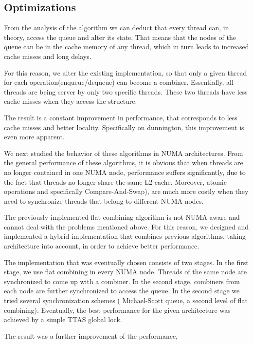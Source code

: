 \subsection{Optimizations}
From the analysis of the algorithm we can deduct that every thread can, in theory, access the queue and alter its state. That means that the nodes of the queue can be in the cache memory of any thread, which in turn leads to increased cache misses and long delays.

For this reason, we alter the existing implementation, so that only a given thread for each operation(enqueue/dequeue) can become a combiner. Essentially, all threads are being server by only two specific threads. These two threads have less cache misses when they access the structure.

The result is a constant improvement in performance, that corresponds  to less cache misses and better locality. Specifically on dunnington, this improvement is even more apparent.

We next  studied the behavior of these algorithms in NUMA architectures. From the general performance of these algorithms, it is obvious that when threads are no longer contained in one NUMA node, performance suffers significantly, due to the fact that threads no longer share the same L2 cache. Moreover, atomic operations and specifically Compare-And-Swap), are much more costly when they need to synchronize threads that belong to different NUMA nodes.

The previously implemented flat combining algorithm is not NUMA-aware and cannot deal with the problems mentioned above. For this reason, we designed and implemented a hybrid implementation that combines previous algorithms, taking architecture into account, in order to achieve better performance.

The implementation that was eventually chosen  consists of two stages. In the first stage, we use flat combining in every NUMA node. Threads of the same node are synchronized to come up with a combiner. In the second stage, combiners from each node are further synchronized to access the queue. In the second stage we tried several synchronization schemes ( Michael-Scott queue, a second level of flat combining). Eventually, the best performance for the given architecture was achieved by a simple TTAS global lock.

The result was a further improvement of the performance,

